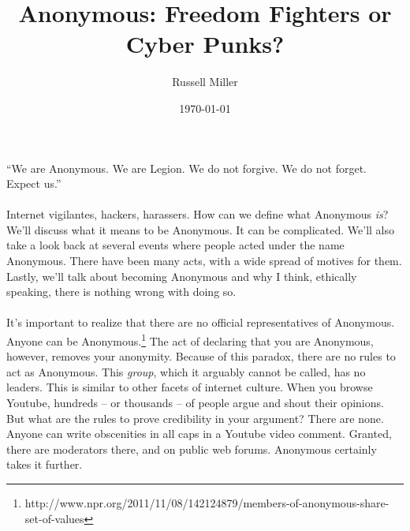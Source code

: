 \documentclass{article}
\title{Anonymous: Freedom Fighters or Cyber Punks?}
\author{Russell Miller}
\date{\today}
\begin{document}
\maketitle

\begin{center}
``We are Anonymous. We are Legion. We do not forgive. We do not forget. Expect 
us.''
\end{center}
\paragraph{}
Internet vigilantes, hackers, harassers.  How can we define what Anonymous 
\emph{is}?  We'll discuss what it means to be Anonymous.  It can be complicated.
We'll also take a look back at several events where people acted under the name 
Anonymous.  There have been many acts, with a wide spread of motives for them.
Lastly, we'll talk about becoming Anonymous and why I think, ethically speaking,
there is nothing wrong with doing so.

\paragraph{} 
It's important to realize that there are no official representatives of Anonymous.  
Anyone can be Anonymous.\footnote{
http://www.npr.org/2011/11/08/142124879/members-of-anonymous-share-set-of-values}
The act of declaring that you are Anonymous, however, removes your anonymity.
Because of this paradox, there are no rules to act as Anonymous.  This 
\emph{group}, which it arguably cannot be called, has no leaders.  This is similar 
to other facets of internet culture.  When you browse Youtube, hundreds -- or 
thousands -- of people argue and shout their opinions.  But what are the rules to 
prove credibility in your argument?  There are none.  Anyone can write obscenities 
in all caps in a Youtube video comment.  Granted, there are moderators there, and 
on public web forums.  Anonymous certainly takes it further.  

\end{document}
